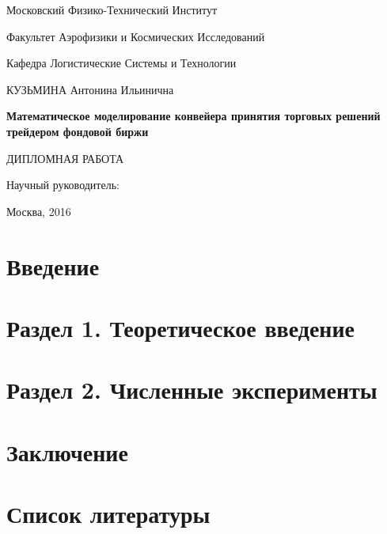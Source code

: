 \documentclass[12pt]{article}
\begin{document}
\thispagestyle{empty}
\begin{center}
\small{Московский Физико-Технический Институт

Факультет Аэрофизики и Космических Исследований

Кафедра Логистические Системы и Технологии}

\parskip=80pt
КУЗЬМИНА Антонина Ильинична
\parskip=30pt

\textbf{\large{Математическое моделирование конвейера принятия торговых решений трейдером фондовой биржи}}

ДИПЛОМНАЯ РАБОТА
\end{center}

\begin{flushright}
\parskip=50pt
Научный руководитель:
\end{flushright}

\vspace{\fill}
\begin{center}
Москва, 2016
\end{center}
\newpage{}
\tableofcontents{}
\newpage{}
\renewcommand\thesection{}
\renewcommand\thesubsection{}
\section{Введение}
\section{Раздел 1. Теоретическое введение}
\section{Раздел 2. Численные эксперименты}
\section{Заключение}
\section{Список литературы}
\end{document}
